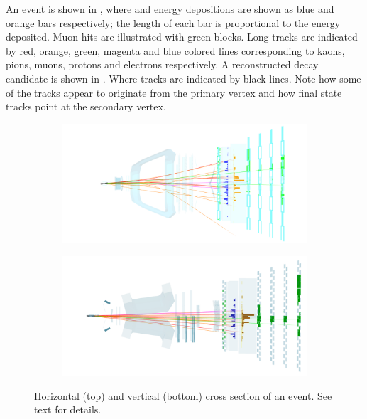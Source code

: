 An \lhcb event is shown in , where \ecal and \hcal energy depositions are
shown as blue and orange bars respectively; the length of each bar is proportional to the energy
deposited. Muon hits are illustrated with green blocks. Long tracks are indicated by red, orange,
green, magenta and blue colored lines corresponding to kaons, pions, muons, protons and electrons
respectively. A reconstructed \BsJpsiKst decay candidate is shown in .
Where \velo tracks are indicated by black lines. Note how some of the \velo tracks appear
to originate from the primary vertex and how \Bs final state tracks point at the secondary vertex.

\begin{figure}[!t]
  \centering
  \begin{subfigure}{\textwidth}
    \includegraphics[width=\textwidth]{Figures/Chapter2/top}
    \label{det_evt_display_top}
  \end{subfigure}
  \begin{subfigure}{\textwidth}
    \includegraphics[width=\textwidth]{Figures/Chapter2/side}
    \label{det_evt_display_side}
  \end{subfigure}
  \caption{Horizontal (top) and vertical (bottom) cross section of an \lhcb event. See text for details.}
  \label{det_evt_display}
\end{figure}
